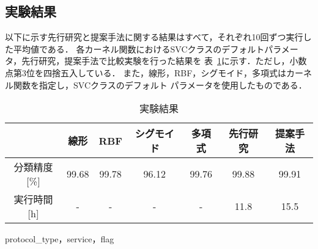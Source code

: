 \subsection{実験結果}
以下に示す先行研究と提案手法に関する結果はすべて，それぞれ10回ずつ実行した平均値である．
各カーネル関数におけるSVCクラスのデフォルトパラメータ，先行研究，提案手法で比較実験を行った結果を
表~\ref{result1}に示す．ただし，小数点第3位を四捨五入している．
また，線形，RBF，シグモイド，多項式はカーネル関数を指定し，SVCクラスのデフォルト
パラメータを使用したものである．
\begin{table}[b]
    \centering
    \caption{実験結果}  %
    \begin{tabular}{|c|c|c|c|c|c|c|}  %
        \hline  %
        ~ & 線形 &RBF &シグモイド&多項式&先行研究 & 提案手法\\  %
        \hline  %
        分類精度[\%]& 99.68&99.78&96.12&99.76&99.88& 99.91\\  %
        \hline  %
        実行時間[h] & - & -&-&-&11.8& 15.5\\  %
        \hline  %
    \end{tabular}
    \label{result1}  %
  \end{table}
  protocol\_type，service，flag
